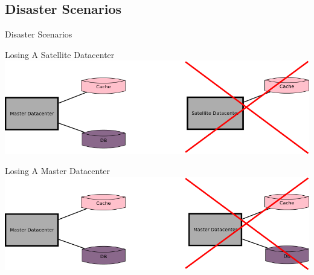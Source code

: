 \documentclass[aspectratio=169]{beamer}
\begin{document}
\subsection{Disaster Scenarios}

{
\begin{frame}{Disaster Scenarios}
\end{frame}
}

\begin{frame}{Losing A Satellite Datacenter}
    \includegraphics[width=\textwidth]{images/lostsatellitedc.png}
\end{frame}

\begin{frame}{Losing A Master Datacenter}
    \includegraphics[width=\textwidth]{images/lostmasterdc.png}
\end{frame}
\end{document}
